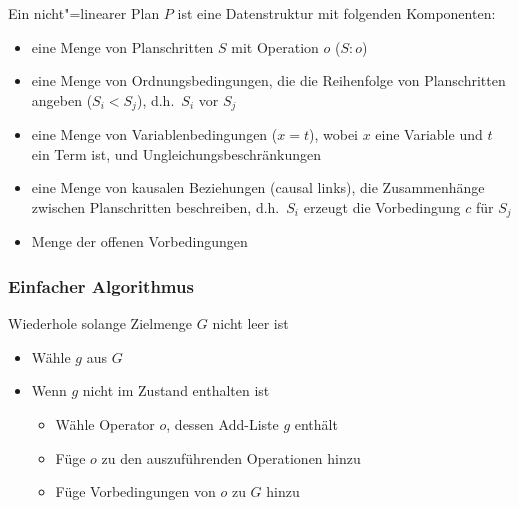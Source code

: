 Ein nicht"=linearer Plan $P$ ist eine Datenstruktur mit folgenden Komponenten:
\begin{itemize}
	\item eine Menge von Planschritten $S$ mit Operation $o$ ($S:o$)
	\item eine Menge von Ordnungsbedingungen, die die Reihenfolge von Planschritten angeben ($S_i < S_j$), d.h.\ \glqq $S_i$ vor $S_j$ \grqq
	\item eine Menge von Variablenbedingungen ($x=t$), wobei $x$ eine Variable und $t$ ein Term ist, und Ungleichungsbeschränkungen
	\item eine Menge von kausalen Beziehungen (causal links), die Zusammenhänge zwischen Planschritten beschreiben, d.h.\ $S_i$ erzeugt die Vorbedingung $c$ für $S_j$
	\item Menge der offenen Vorbedingungen
\end{itemize}

\subsubsection{Einfacher Algorithmus}
Wiederhole solange Zielmenge $G$ nicht leer ist
\begin{itemize}
	\item Wähle $g$ aus $G$
	\item Wenn $g$ nicht im Zustand enthalten ist
	\begin{itemize}
		\item Wähle Operator $o$, dessen Add-Liste $g$ enthält
		\item Füge $o$ zu den auszuführenden Operationen hinzu
		\item Füge Vorbedingungen von $o$ zu $G$ hinzu
	\end{itemize}
\end{itemize}

